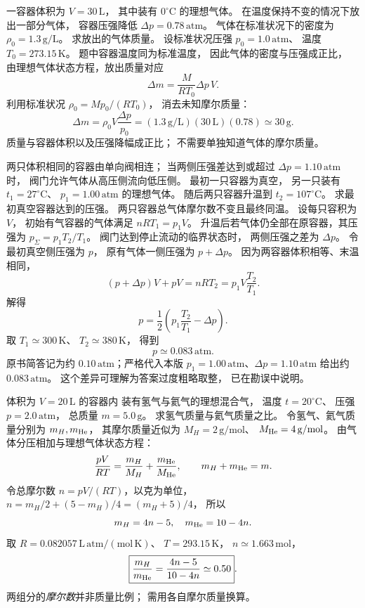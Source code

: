 
一容器体积为 $V=30\,\mathrm L$，
其中装有 $0^\circ\mathrm C$ 的理想气体。
在温度保持不变的情况下放出一部分气体，
容器压强降低
$\Delta p=0.78\,\mathrm{atm}$。
气体在标准状况下的密度为
$\rho_0=1.3\,\mathrm{g/L}$。
求放出的气体质量。
\exsolution
设标准状况压强
$p_0=1.0\,\mathrm{atm}$、
温度 $T_0=273.15\,\mathrm K$。
题中容器温度同为标准温度，
因此气体的密度与压强成正比，
由理想气体状态方程，放出质量对应
\[
\Delta m=\frac{M}{RT_0}\Delta p\,V.
\]
利用标准状况
$\rho_0=Mp_0/(RT_0)$，
消去未知摩尔质量：
\[
\boxed{\Delta m=\rho_0 V\frac{\Delta p}{p_0}
=(1.3\,\mathrm{g/L})(30\,\mathrm L)(0.78)
\simeq30\,\mathrm g}.
\]
\excheck 质量与容器体积以及压强降幅成正比；
不需要单独知道气体的摩尔质量。

两只体积相同的容器由单向阀相连；
当两侧压强差达到或超过
$\Delta p=1.10\,\mathrm{atm}$ 时，
阀门允许气体从高压侧流向低压侧。
最初一只容器为真空，
另一只装有
$t_1=27^\circ\mathrm C$、
$p_1=1.00\,\mathrm{atm}$
的理想气体。
随后两只容器升温到
$t_2=107^\circ\mathrm C$。
求最初真空容器达到的压强。
\exsolution
两只容器总气体摩尔数不变且最终同温。
设每只容积为 $V$，
初始有气容器的气体满足
$nR T_1=p_1V$。
升温后若气体仍全部在原容器，其压强为
$p_\Sigma=p_1 T_2/T_1$。
阀门达到停止流动的临界状态时，
两侧压强之差为 $\Delta p$。
令最初真空侧压强为 $p$，
原有气体一侧压强为 $p+\Delta p$。
因为两容器体积相等、末温相同，
\[
(p+\Delta p)V+pV=nRT_2
=p_1V\frac{T_2}{T_1}.
\]
解得
\[
\boxed{p=\frac12\left(
p_1\frac{T_2}{T_1}-\Delta p\right)}.
\]
取 $T_1\simeq300\,\mathrm K$、
$T_2\simeq380\,\mathrm K$，
得到
\[
\boxed{p\simeq0.083\,\mathrm{atm}}.
\]
\excheck 原书简答记为约
$0.10\,\mathrm{atm}$；严格代入本版
$p_1=1.00\,\mathrm{atm}$、$\Delta p=1.10\,\mathrm{atm}$
给出约 $0.083\,\mathrm{atm}$。
这个差异可理解为答案过度粗略取整，
已在勘误中说明。

体积为 $V=20\,\mathrm L$ 的容器内
装有氢气与氦气的理想混合气，
温度 $t=20^\circ\mathrm C$、
压强 $p=2.0\,\mathrm{atm}$，
总质量 $m=5.0\,\mathrm g$。
求氢气质量与氦气质量之比。
\exsolution
令氢气、氦气质量分别为 $m_H,m_{\rm He}$，
其摩尔质量近似为
$M_H=2\,\mathrm{g/mol}$、
$M_{\rm He}=4\,\mathrm{g/mol}$。
由气体分压相加与理想气体状态方程：
\[
\frac{pV}{RT}=\frac{m_H}{M_H}
+\frac{m_{\rm He}}{M_{\rm He}},
\qquad
m_H+m_{\rm He}=m.
\]
令总摩尔数
$n=pV/(RT)$，以克为单位，
$n=m_H/2+(5-m_H)/4=(m_H+5)/4$，
所以
\[
m_H=4n-5,\quad m_{\rm He}=10-4n.
\]
取
$R=0.082057\,\mathrm{L\,atm/(mol\,K)}$、
$T=293.15\,\mathrm K$，
$n\simeq1.663\,\mathrm{mol}$，
\[
\boxed{\frac{m_H}{m_{\rm He}}
=\frac{4n-5}{10-4n}\simeq0.50}.
\]
\excheck 两组分的\emph{摩尔数}并非质量比例；
需用各自摩尔质量换算。

